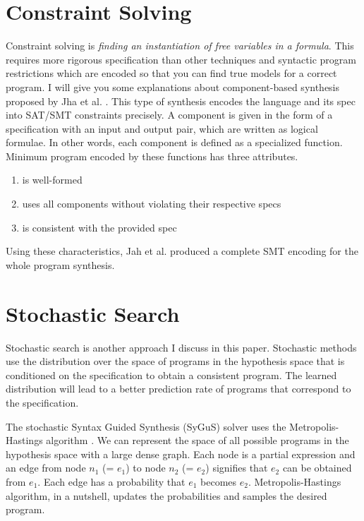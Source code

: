 \documentclass[12pt, a4paper, titlepage]{report}
\begin{document}
  \section{Constraint Solving}
    Constraint solving is \textit{finding an instantiation of free variables in a formula}. This requires more rigorous specification than other techniques and syntactic program restrictions which are encoded so that you can find true models for a correct program.
    I will give you some explanations about component-based synthesis proposed by Jha et al. \cite{jha:2010}.
    This type of synthesis encodes the language and its spec into SAT/SMT constraints precisely. A component is given in the form of a specification with an input and output pair, which are written as logical formulae. In other words, each component is defined as a specialized function.
    Minimum program encoded by these functions has three attributes.
    \begin{enumerate}
        \item is well-formed
        \item uses all components without violating their respective specs
        \item is consistent with the provided spec
    \end{enumerate}
    Using these characteristics, Jah et al. produced a complete SMT encoding for the whole program synthesis.

  \section{Stochastic Search}
    Stochastic search is another approach I discuss in this paper.
    Stochastic methods use the distribution over the space of programs in the hypothesis space that is conditioned on the specification to obtain a consistent program.
    The learned distribution will lead to a better prediction rate of programs that correspond to the specification.

    The stochastic Syntax Guided Synthesis (SyGuS) solver uses the Metropolis-Hastings algorithm \cite{alur:2013}.
    We can represent the space of all possible programs in the hypothesis space with a large dense graph.
    Each node is a partial expression and an edge from node $n_1$ (= $e_1$) to node $n_2$ (= $e_2$) signifies that $e_2$ can be obtained from $e_1$.
    Each edge has a probability that $e_1$ becomes $e_2$.
    Metropolis-Hastings algorithm, in a nutshell, updates the probabilities and samples the desired program.
\end{document}
